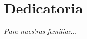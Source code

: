 \chapter*{Dedicatoria}

\begin{flushright}
	\textit{Para nuestras familias...}
\end{flushright}

\clearpage{\thispagestyle{empty}\cleardoublepage}       %